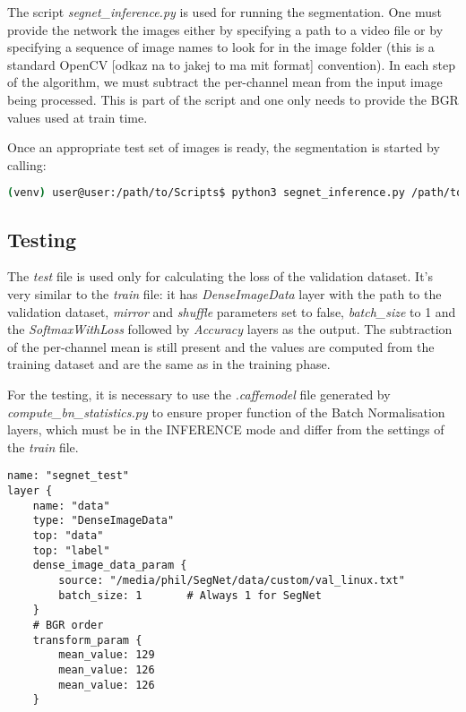 The script \textit{segnet\_inference.py} is used for running the segmentation. One must provide the network the images either by specifying a path to a video file or by specifying a sequence of image names to look for in the image folder (this is a standard OpenCV [odkaz na to jakej to ma mit format] convention). In each step of the algorithm, we must subtract the per-channel mean from the input image being processed. This is part of the script and one only needs to provide the BGR values used at train time.

Once an appropriate test set of images is ready, the segmentation is started by calling:

\begin{lstlisting}[language=bash]
(venv) user@user:/path/to/Scripts$ python3 segnet_inference.py /path/to/inference.prototxt /path/to/final_weights.caffemodel /path/to/videofile.avi 
\end{lstlisting}

\subsection{Testing}

The \textit{test} file is used only for calculating the loss of the validation dataset. It's very similar to the \textit{train} file: it has \textit{DenseImageData} layer with the path to the validation dataset, \textit{mirror} and \textit{shuffle} parameters set to false, \textit{batch\_size} to 1 and the \textit{SoftmaxWithLoss} followed by \textit{Accuracy} layers as the output. The subtraction of the per-channel mean is still present and the values are computed from the training dataset and are the same as in the training phase. 

For the testing, it is necessary to use the \textit{.caffemodel} file generated by \textit{compute\_bn\_statistics.py} to ensure proper function of the Batch Normalisation layers, which must be in the INFERENCE mode and differ from the settings of the \textit{train} file.

\begin{lstlisting}[caption={Setting up the input layer of \textit{test.prototxt}},captionpos=b]
name: "segnet_test"
layer {
	name: "data"
	type: "DenseImageData"
	top: "data"
	top: "label"
	dense_image_data_param {
		source: "/media/phil/SegNet/data/custom/val_linux.txt"	
		batch_size: 1		# Always 1 for SegNet
	}
	# BGR order
	transform_param {
		mean_value: 129
		mean_value: 126
		mean_value: 126 
	}  
	
\end{lstlisting}

